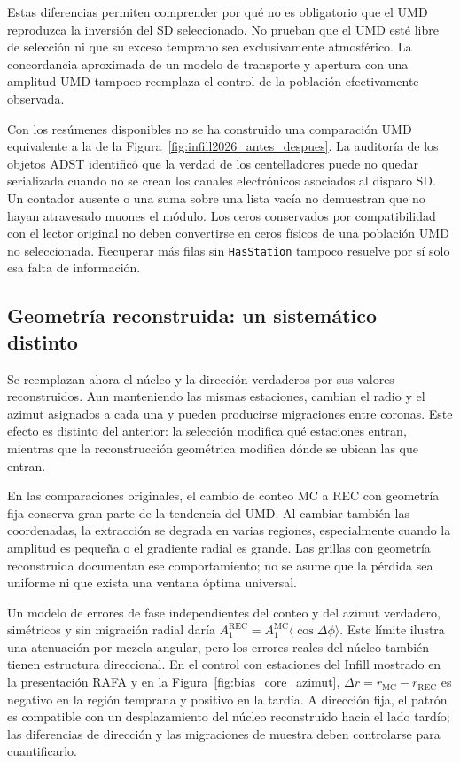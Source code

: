 Estas diferencias permiten comprender por qué no es obligatorio que el UMD reproduzca la inversión del SD seleccionado. No prueban que el UMD esté libre de selección ni que su exceso temprano sea exclusivamente atmosférico. La concordancia aproximada de un modelo de transporte y apertura con una amplitud UMD tampoco reemplaza el control de la población efectivamente observada.

Con los resúmenes disponibles no se ha construido una comparación UMD equivalente a la de la Figura~\ref{fig:infill2026_antes_despues}. La auditoría de los objetos ADST identificó que la verdad de los centelladores puede no quedar serializada cuando no se crean los canales electrónicos asociados al disparo SD. Un contador ausente o una suma sobre una lista vacía no demuestran que no hayan atravesado muones el módulo. Los ceros conservados por compatibilidad con el lector original no deben convertirse en ceros físicos de una población UMD no seleccionada. Recuperar más filas sin \texttt{HasStation} tampoco resuelve por sí solo esa falta de información.

\subsection{Geometría reconstruida: un sistemático distinto}
\label{subsec:infill_rec}

Se reemplazan ahora el núcleo y la dirección verdaderos por sus valores reconstruidos. Aun manteniendo las mismas estaciones, cambian el radio y el azimut asignados a cada una y pueden producirse migraciones entre coronas. Este efecto es distinto del anterior: la selección modifica qué estaciones entran, mientras que la reconstrucción geométrica modifica dónde se ubican las que entran.

En las comparaciones originales, el cambio de conteo MC a REC con geometría fija conserva gran parte de la tendencia del UMD. Al cambiar también las coordenadas, la extracción se degrada en varias regiones, especialmente cuando la amplitud es pequeña o el gradiente radial es grande. Las grillas con geometría reconstruida documentan ese comportamiento; no se asume que la pérdida sea uniforme ni que exista una ventana óptima universal.

Un modelo de errores de fase independientes del conteo y del azimut verdadero, simétricos y sin migración radial daría $A_1^{\mathrm{REC}}=A_1^{\mathrm{MC}}\langle\cos\Delta\phi\rangle$. Este límite ilustra una atenuación por mezcla angular, pero los errores reales del núcleo también tienen estructura direccional. En el control con estaciones del Infill mostrado en la presentación RAFA y en la Figura~\ref{fig:bias_core_azimut}, $\Delta r=r_{\mathrm{MC}}-r_{\mathrm{REC}}$ es negativo en la región temprana y positivo en la tardía. A dirección fija, el patrón es compatible con un desplazamiento del núcleo reconstruido hacia el lado tardío; las diferencias de dirección y las migraciones de muestra deben controlarse para cuantificarlo.


